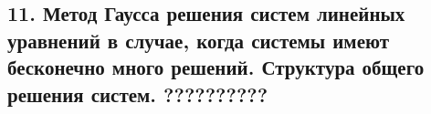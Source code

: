 {
\subsection{11.	Метод Гаусса решения систем линейных уравнений в случае, когда системы имеют бесконечно много решений. Структура общего решения систем. ??????????}
}